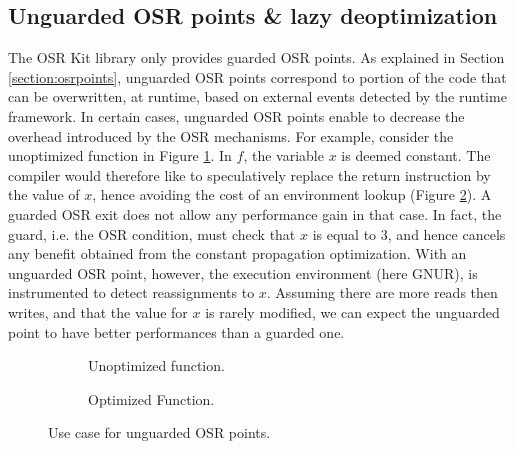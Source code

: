 \subsection{Unguarded OSR points \& lazy deoptimization}

The OSR Kit\cite{OSRKit} library only provides guarded OSR points.
As explained in Section \ref{section:osrpoints}, unguarded OSR points correspond to portion of the code that can be overwritten, at runtime, based on external events detected by the runtime framework.
In certain cases, unguarded OSR points enable to decrease the overhead introduced by the OSR mechanisms. 
For example, consider the unoptimized function in Figure \ref{fig:lazydeoptnorm}. 
In $f$, the variable $x$ is deemed constant. 
The compiler would therefore like to speculatively replace the return instruction by the value of $x$, hence avoiding the cost of an environment lookup (Figure \ref{fig:lazydeoptopt}).
A guarded OSR exit does not allow any performance gain in that case.
In fact, the guard, i.e. the OSR condition, must check that $x$ is equal to $3$, and hence cancels any benefit obtained from the constant propagation optimization.
With an unguarded OSR point, however, the execution environment (here GNUR), is instrumented to detect reassignments to $x$.
Assuming there are more reads then writes, and that the value for $x$ is rarely modified, we can expect the unguarded point to have better performances than a guarded one.\\

\begin{figure}[h]
    \centering
    \begin{subfigure}{.49\textwidth}
        \caption{Unoptimized function.}
        \label{fig:lazydeoptnorm}
    \end{subfigure}
    \centering
    \begin{subfigure}{.49\textwidth}
        \caption{Optimized Function.}
        \label{fig:lazydeoptopt}   
    \end{subfigure}
    \caption{Use case for unguarded OSR points.}
    \label{fig:unguardedosrpointexample}
\end{figure}

